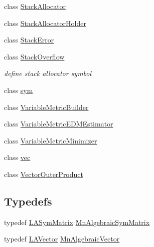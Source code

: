 \begin{DoxyCompactItemize}
\item 
class \mbox{\hyperlink{classROOT_1_1Minuit2_1_1StackAllocator}{Stack\+Allocator}}
\item 
class \mbox{\hyperlink{classROOT_1_1Minuit2_1_1StackAllocatorHolder}{Stack\+Allocator\+Holder}}
\item 
class \mbox{\hyperlink{classROOT_1_1Minuit2_1_1StackError}{Stack\+Error}}
\item 
class \mbox{\hyperlink{classROOT_1_1Minuit2_1_1StackOverflow}{Stack\+Overflow}}
\begin{DoxyCompactList}\small\item\em define stack allocator symbol \end{DoxyCompactList}\item 
class \mbox{\hyperlink{classROOT_1_1Minuit2_1_1sym}{sym}}
\item 
class \mbox{\hyperlink{classROOT_1_1Minuit2_1_1VariableMetricBuilder}{Variable\+Metric\+Builder}}
\item 
class \mbox{\hyperlink{classROOT_1_1Minuit2_1_1VariableMetricEDMEstimator}{Variable\+Metric\+E\+D\+M\+Estimator}}
\item 
class \mbox{\hyperlink{classROOT_1_1Minuit2_1_1VariableMetricMinimizer}{Variable\+Metric\+Minimizer}}
\item 
class \mbox{\hyperlink{classROOT_1_1Minuit2_1_1vec}{vec}}
\item 
class \mbox{\hyperlink{classROOT_1_1Minuit2_1_1VectorOuterProduct}{Vector\+Outer\+Product}}
\end{DoxyCompactItemize}
\subsection*{Typedefs}
\begin{DoxyCompactItemize}
\item 
typedef \mbox{\hyperlink{classROOT_1_1Minuit2_1_1LASymMatrix}{L\+A\+Sym\+Matrix}} \mbox{\hyperlink{namespaceROOT_1_1Minuit2_a9e74ad97f5537a2e80e52b04d98ecc6e}{Mn\+Algebraic\+Sym\+Matrix}}
\item 
typedef \mbox{\hyperlink{classROOT_1_1Minuit2_1_1LAVector}{L\+A\+Vector}} \mbox{\hyperlink{namespaceROOT_1_1Minuit2_a62ed97730a1ca8d3fbaec64a19aa11c9}{Mn\+Algebraic\+Vector}}
\end{DoxyCompactItemize}
